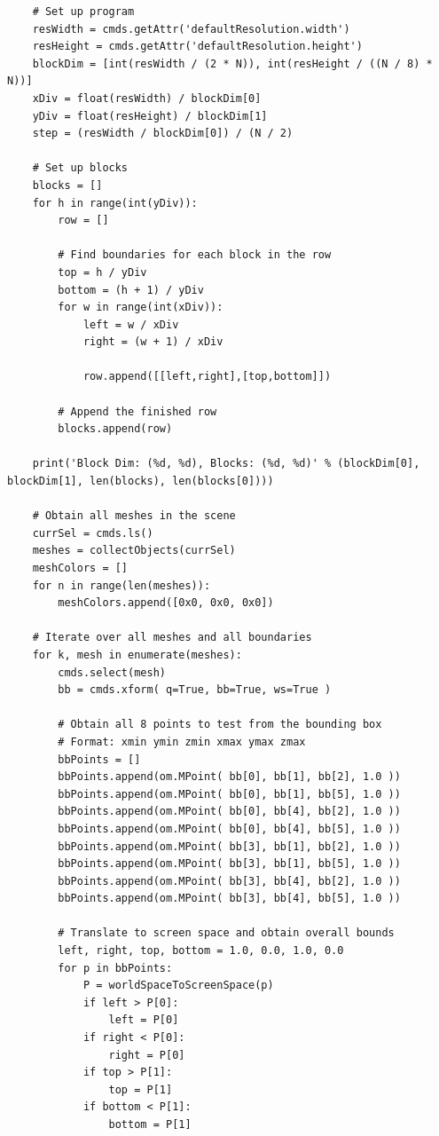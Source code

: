 \documentclass[conference]{IEEEtran}
\begin{document}
{{\begin{verbatim}
    # Set up program
    resWidth = cmds.getAttr('defaultResolution.width')
    resHeight = cmds.getAttr('defaultResolution.height')
    blockDim = [int(resWidth / (2 * N)), int(resHeight / ((N / 8) * N))]
    xDiv = float(resWidth) / blockDim[0]
    yDiv = float(resHeight) / blockDim[1]
    step = (resWidth / blockDim[0]) / (N / 2)
        
    # Set up blocks
    blocks = []
    for h in range(int(yDiv)):
        row = []
        
        # Find boundaries for each block in the row
        top = h / yDiv
        bottom = (h + 1) / yDiv
        for w in range(int(xDiv)):
            left = w / xDiv
            right = (w + 1) / xDiv
            
            row.append([[left,right],[top,bottom]])
            
        # Append the finished row
        blocks.append(row)
            
    print('Block Dim: (%d, %d), Blocks: (%d, %d)' % (blockDim[0], blockDim[1], len(blocks), len(blocks[0])))
    
    # Obtain all meshes in the scene
    currSel = cmds.ls()
    meshes = collectObjects(currSel)
    meshColors = []
    for n in range(len(meshes)):
        meshColors.append([0x0, 0x0, 0x0])
    
    # Iterate over all meshes and all boundaries
    for k, mesh in enumerate(meshes):
        cmds.select(mesh)
        bb = cmds.xform( q=True, bb=True, ws=True )
        
        # Obtain all 8 points to test from the bounding box
        # Format: xmin ymin zmin xmax ymax zmax
        bbPoints = []
        bbPoints.append(om.MPoint( bb[0], bb[1], bb[2], 1.0 ))
        bbPoints.append(om.MPoint( bb[0], bb[1], bb[5], 1.0 ))
        bbPoints.append(om.MPoint( bb[0], bb[4], bb[2], 1.0 ))
        bbPoints.append(om.MPoint( bb[0], bb[4], bb[5], 1.0 ))
        bbPoints.append(om.MPoint( bb[3], bb[1], bb[2], 1.0 ))
        bbPoints.append(om.MPoint( bb[3], bb[1], bb[5], 1.0 ))
        bbPoints.append(om.MPoint( bb[3], bb[4], bb[2], 1.0 ))
        bbPoints.append(om.MPoint( bb[3], bb[4], bb[5], 1.0 ))
        
        # Translate to screen space and obtain overall bounds
        left, right, top, bottom = 1.0, 0.0, 1.0, 0.0
        for p in bbPoints:
            P = worldSpaceToScreenSpace(p)
            if left > P[0]:
                left = P[0]
            if right < P[0]:
                right = P[0]
            if top > P[1]:
                top = P[1]
            if bottom < P[1]:
                bottom = P[1]
                    

\end{verbatim}}}
\end{document}
